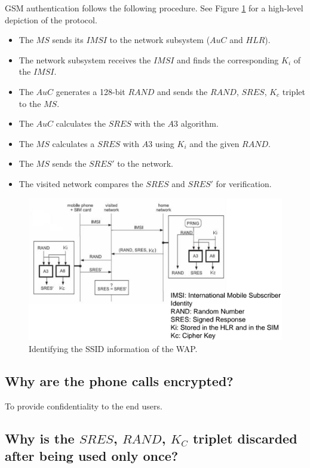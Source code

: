 \documentclass[a4paper]{report}
\begin{document}
GSM authentication follows the following procedure.  See Figure \ref{fig:prob1a} for a high-level depiction of
the protocol. 

\begin{itemize}
\item The $MS$ sends its $IMSI$ to the network subsystem ($AuC$ and $HLR$).
\item The network subsystem receives the $IMSI$ and finds the corresponding $K_i$ of the $IMSI$.
\item The $AuC$ generates a 128-bit $RAND$ and sends the $RAND$, $SRES$, $K_c$ triplet to the $MS$.
\item The $AuC$ calculates the $SRES$ with the $A3$ algorithm.
\item The $MS$ calculates a $SRES$ with $A3$ using $K_i$ and the given $RAND$.
\item The $MS$ sends the $SRES'$ to the network.
\item The visited network compares the $SRES$ and $SRES'$ for verification.
\end{itemize}

\begin{figure}
\begin{mdframed}
\includegraphics[scale=0.2]{GSM_Authentication_Protocol.png}
\caption{Identifying the SSID information of the WAP.}
\label{fig:prob1a}
\end{mdframed}
\end{figure}

\subsection{Why are the phone calls encrypted?}

To provide confidentiality to the end users.

\subsection{Why is the $SRES$, $RAND$, $K_C$ triplet discarded after being used only once?}
\end{document}
